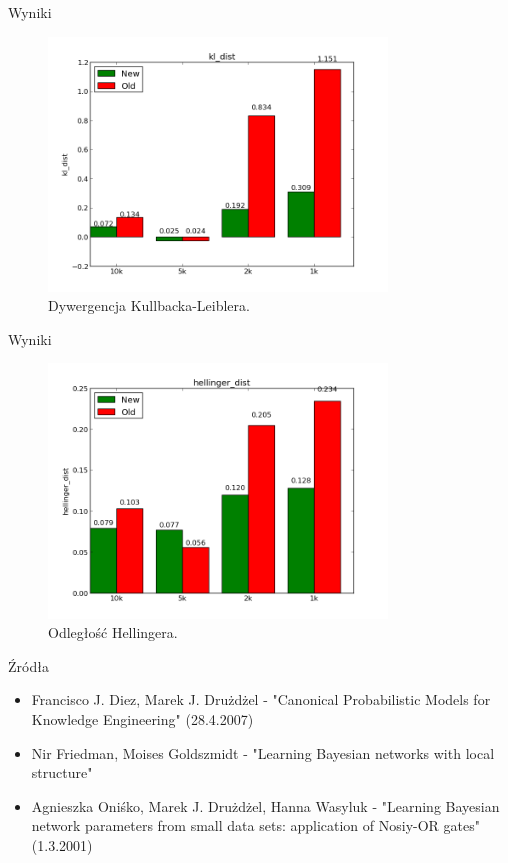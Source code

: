 \documentclass{beamer}
\begin{document}
\begin{frame}{Wyniki}
	\begin{figure}[h!]
		\centering
		\includegraphics[width=9cm]{kl_dist.png}
		\caption{Dywergencja Kullbacka-Leiblera.}
	\end{figure}
\end{frame}

\begin{frame}{Wyniki}
	\begin{figure}[h!]
		\centering
		\includegraphics[width=9cm]{hellinger_dist.png}
		\caption{Odległość Hellingera.}
	\end{figure}
\end{frame}



\begin{frame}{Źródła}
	\begin{itemize}
		\item Francisco J. Diez, Marek J. Drużdżel - "Canonical Probabilistic Models for Knowledge Engineering" (28.4.2007)
		\item Nir Friedman, Moises Goldszmidt - "Learning Bayesian networks with local structure"
		\item Agnieszka Oniśko, Marek J. Drużdżel, Hanna Wasyluk - "Learning Bayesian network parameters from small data sets: application of Nosiy-OR gates" (1.3.2001)
	\end{itemize}
\end{frame}
\end{document}
